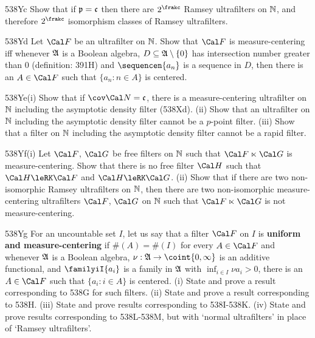 {\spheader 538Yc Show that if $\frak p=\frak c$ then there are
$2^{\frakc}$
Ramsey ultrafilters on $\Bbb N$, and therefore $2^{\frakc}$ isomorphism
classes of Ramsey ultrafilters.

\spheader 538Yd Let $\Cal F$ be an ultrafilter on $\Bbb N$.   Show that
$\Cal F$ is measure-centering iff whenever $\frak A$ is a Boolean algebra,
$D\subseteq\frak A\setminus\{0\}$ has intersection number greater than
$0$ (definition: 391H) and $\sequencen{a_n}$ is a sequence in $D$, then
there is an $A\in\Cal F$ such that $\{a_n:n\in A\}$ is centered.

\spheader 538Ye(i) Show that if $\cov\Cal N=\frak c$, there is a
measure-centering ultrafilter on $\Bbb N$
including the asymptotic density filter (538Xd).   (ii) Show that an
ultrafilter on
$\Bbb N$ including the asymptotic density filter cannot be a
$p$-point filter.
(iii) Show that a filter on $\Bbb N$ including the asymptotic density
filter cannot be a rapid filter.

\spheader 538Yf(i) Let $\Cal F$, $\Cal G$ be free filters on $\Bbb N$ such
that $\Cal F\ltimes\Cal G$ is measure-centering.   Show that there is no
free filter $\Cal H$ such that $\Cal H\leRK\Cal F$ and $\Cal H\leRK\Cal G$.
(ii) Show that if there are two non-isomorphic Ramsey
ultrafilters on $\Bbb N$, then there are  two
non-isomorphic measure-centering ultrafilters $\Cal F$, $\Cal G$ on
$\Bbb N$ such that $\Cal F\ltimes\Cal G$ is not measure-centering.

\spheader 538Yg For an uncountable set $I$,
let us say that a filter $\Cal F$
on $I$ is {\bf uniform and measure-centering} if $\#(A)=\#(I)$ for every
$A\in\Cal F$ and whenever $\frak A$ is a Boolean algebra,
$\nu:\frak A\to\coint{0,\infty}$ is an additive functional, and
$\familyiI{a_i}$ is a family in $\frak A$ with
$\inf_{i\in I}\nu a_i>0$, there is an $A\in\Cal F$ such that
$\{a_i:i\in A\}$ is centered.   (i) State and prove a result corresponding
to 538G for such filters.      (ii) State and
prove a result corresponding to 538H.   
(iii) State and prove results corresponding to 538I-538K. %
(iv) State and prove results corresponding to 538L-538M, but with
`normal ultrafilters' in place of `Ramsey ultrafilters'.

}
